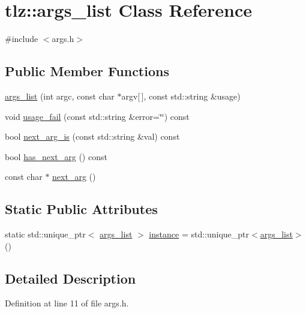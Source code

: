 \hypertarget{classtlz_1_1args__list}{}\section{tlz\+:\+:args\+\_\+list Class Reference}
\label{classtlz_1_1args__list}


{\ttfamily \#include $<$args.\+h$>$}

\subsection*{Public Member Functions}
\begin{DoxyCompactItemize}
\item 
\hyperlink{classtlz_1_1args__list_a4e338506c7dc38f0a215097e204f31cf}{args\+\_\+list} (int argc, const char $\ast$argv\mbox{[}$\,$\mbox{]}, const std\+::string \&usage)
\item 
void \hyperlink{classtlz_1_1args__list_a38ad21acd64a4af98ffdf4a47837cdbe}{usage\+\_\+fail} (const std\+::string \&error=\char`\"{}\char`\"{}) const 
\item 
bool \hyperlink{classtlz_1_1args__list_ae7c07d1c8f24c2aa4fe0ba68ec45d353}{next\+\_\+arg\+\_\+is} (const std\+::string \&val) const 
\item 
bool \hyperlink{classtlz_1_1args__list_a4aee93f4b0d9b5b4e7a5d13cb637337c}{has\+\_\+next\+\_\+arg} () const 
\item 
const char $\ast$ \hyperlink{classtlz_1_1args__list_a73d99bc75998dc14607a3a372d28dc6d}{next\+\_\+arg} ()
\end{DoxyCompactItemize}
\subsection*{Static Public Attributes}
\begin{DoxyCompactItemize}
\item 
static std\+::unique\+\_\+ptr$<$ \hyperlink{classtlz_1_1args__list}{args\+\_\+list} $>$ \hyperlink{classtlz_1_1args__list_a0617ca3169bfad6933b84514c4fee4ea}{instance} = std\+::unique\+\_\+ptr$<$\hyperlink{classtlz_1_1args__list}{args\+\_\+list}$>$()
\end{DoxyCompactItemize}


\subsection{Detailed Description}


Definition at line 11 of file args.\+h.



